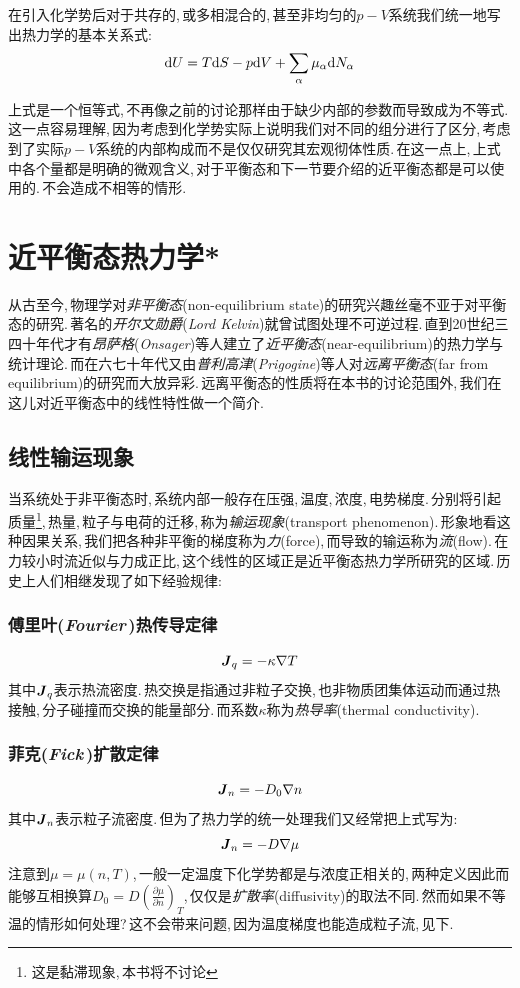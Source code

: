 在引入化学势后对于共存的,\,或多相混合的,\,甚至非均匀的$p-V$系统我们统一地写出热力学的基本关系式:
\[\textrm{d} U=T\textrm{d} S-p\textrm{d} V+\sum_\alpha \mu_\alpha\textrm{d} N_\alpha\]

上式是一个恒等式,\,不再像之前的讨论那样由于缺少内部的参数而导致成为不等式.\,这一点容易理解,\,因为考虑到化学势实际上说明我们对不同的组分进行了区分,\,考虑到了实际$p-V$系统的内部构成而不是仅仅研究其宏观彻体性质.\,在这一点上,\,上式中各个量都是明确的微观含义,\,对于平衡态和下一节要介绍的近平衡态都是可以使用的.\,不会造成不相等的情形.


\section{近平衡态热力学*}

从古至今,\,物理学对\emph{非平衡态}(non-equilibrium state)的研究兴趣丝毫不亚于对平衡态的研究.\,著名的\emph{开尔文勋爵}({\it Lord Kelvin})就曾试图处理不可逆过程.\,直到20世纪三四十年代才有\emph{昂萨格}({\it Onsager})等人建立了\emph{近平衡态}(near-equilibrium)的热力学与统计理论.\,而在六七十年代又由\emph{普利高津}({\it Prigogine})等人对\emph{远离平衡态}(far from equilibrium)的研究而大放异彩.\,远离平衡态的性质将在本书的讨论范围外,\,我们在这儿对近平衡态中的线性特性做一个简介.

\subsection{线性输运现象}
当系统处于非平衡态时,\,系统内部一般存在压强,\,温度,\,浓度,\,电势梯度.\,分别将引起质量\footnote{这是黏滞现象,\,本书将不讨论},\,热量,\,粒子与电荷的迁移,\,称为\emph{输运现象}(transport phenomenon).\,形象地看这种因果关系,\,我们把各种非平衡的梯度称为\emph{力}(force),\,而导致的输运称为\emph{流}(flow).\,在力较小时流近似与力成正比,\,这个线性的区域正是近平衡态热力学所研究的区域.\,历史上人们相继发现了如下经验规律:

\subsubsection{\hei 傅里叶({\it Fourier\,})热传导定律}
\[\boldsymbol{J}_q=-\kappa\nabla T\]
其中\(\boldsymbol{J}_q\)表示热流密度.\,热交换是指通过非粒子交换,\,也非物质团集体运动而通过热接触,\,分子碰撞而交换的能量部分.\,而系数\(\kappa\)称为\emph{热导率}(thermal conductivity).

\subsubsection{\hei 菲克({\it Fick\,})扩散定律}
\[\boldsymbol{J}_n=-D_0\nabla n\]
其中\(\boldsymbol{J}_n\)表示粒子流密度.\,但为了热力学的统一处理我们又经常把上式写为:
\[\boldsymbol{J}_n=-D\nabla \mu\]
注意到\(\mu=\mu(n,T)\),\,一般一定温度下化学势都是与浓度正相关的,\,两种定义因此而能够互相换算\(\displaystyle D_0=D\left(\frac{\partial \mu}{\partial n}\right)_T\),\,仅仅是\emph{扩散率}(diffusivity)的取法不同.\,然而如果不等温的情形如何处理?\,这不会带来问题,\,因为温度梯度也能造成粒子流,\,见下.

